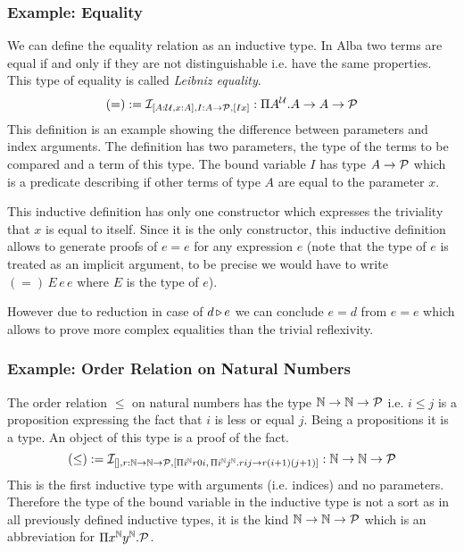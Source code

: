 \subsubsection{Example: Equality}

We can define the equality relation as an inductive type. In Alba two terms
are equal if and only if they are not distinguishable i.e. have the same
properties. This type of equality is called \emph{Leibniz equality}.
%
$$
(=)
:=
{\cal I }_{[A:{\cal{U}}, x:A], I:A\to{\cal{P}}, [I x]}
:
\Pi A^{\cal{U}}. A \to A \to {\cal{P}}
$$
%
This definition is an example showing the difference between parameters and
index arguments. The definition has two parameters, the type of the terms to
be compared and a term of this type. The bound variable $I$ has type
$A\to{\cal{P}}$ which is a predicate describing if other terms of type $A$ are
equal to the parameter $x$.

This inductive definition has only one constructor which expresses the
triviality that $x$ is equal to itself. Since it is the only constructor, this
inductive definition allows to generate proofs of $e = e$ for any expression
$e$ {\scriptsize (note that the type of $e$ is treated as an implicit argument, to
  be precise we would have to write $(=) \, E \, e \, e$ where $E$ is the type
  of $e$)}.

However due to reduction in case of $d {\,\triangleright\,} e$ we can conclude $e = d$ from
$e = e$ which allows to prove more complex equalities than the trivial
reflexivity.



\subsubsection{Example: Order Relation on Natural Numbers}

The order relation $\le$ on natural numbers has the type ${\mathbb{N}} \to
{\mathbb{N}} \to {\cal{P}}$ i.e. $i \le j$ is a proposition expressing the fact that
$i$ is less or equal $j$. Being a propositions it is a type. An object of this
type is a proof of the fact.
$$
(\le)
:=
{\cal I }_{
  [],
  r:{\mathbb{N}} \to {\mathbb{N}} \to {\cal{P}},
  [\Pi i^{\mathbb{N}} r 0 i ,\, \Pi i^{\mathbb{N}} j^{\mathbb{N}}. r i j \to r (i+1) (j+1)]
}
:
{\mathbb{N}} \to {\mathbb{N}} \to {\cal{P}}
$$
%
This is the first inductive type with arguments (i.e. indices) and no
parameters. Therefore the type of the bound variable in the inductive type is
not a sort as in all previously defined inductive types, it is the kind
${\mathbb{N}} \to {\mathbb{N}} \to {\cal{P}}$ which is an abbreviation for
$\Pi x^{\mathbb{N}} y^{\mathbb{N}}. {\cal{P}}$.

